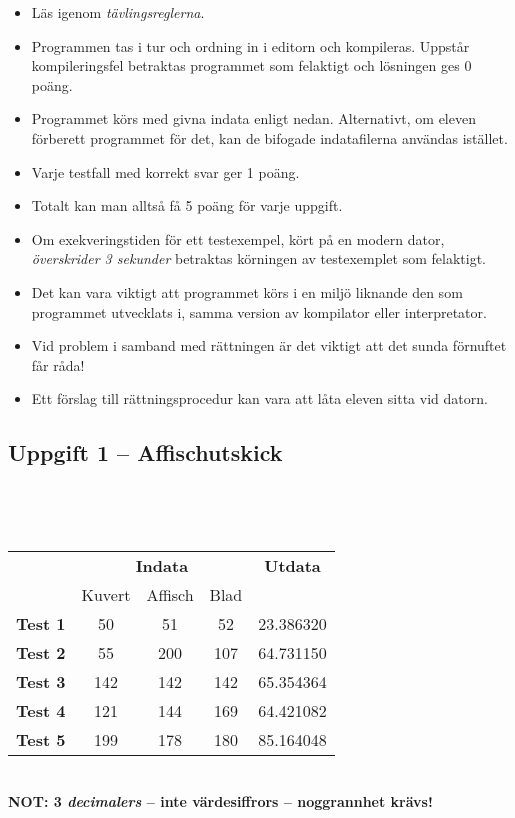 \documentclass[a4paper,12pt,oneside]{amsbook}
\theoremstyle{test}
\newcommand{\fe}[1]{\textbf{#1}}            %
\begin{document}


\thispagestyle{fancy}
\lhead{}
\begin{itemize}
\item Läs igenom \textit{tävlingsreglerna}.
\item Programmen tas i tur och ordning in i editorn och kompileras.
Uppstår kompileringsfel betraktas programmet som felaktigt och lösningen
ges $0$ poäng.
\item Programmet körs med givna indata enligt nedan. Alternativt, om eleven förberett programmet för det, kan de bifogade indatafilerna användas istället.
\item Varje testfall
  med korrekt svar ger 1 poäng.
\item
Totalt kan man
  alltså få 5 poäng för varje uppgift.
\item Om exekveringstiden för ett testexempel, kört på en modern dator,
\textit{överskrider 3 sekunder} betraktas körningen av testexemplet som felaktigt.
\item Det kan vara viktigt att programmet körs i en miljö liknande den som
programmet utvecklats i, samma version av kompilator eller
interpretator.
\item Vid problem i samband med rättningen är det viktigt att det sunda
förnuftet får råda!
\item Ett förslag till rättningsprocedur kan vara att låta eleven
sitta vid datorn.
\end{itemize}

\vspace{2cm}

\subsection*{Uppgift 1 -- Affischutskick}
~\\
{\tt 
\begin{tabular}{||l||c|c|c||c||}\hline\hline
& \multicolumn{3}{c||}{\fe{Indata}} & \fe{Utdata} \\ 
& Kuvert & Affisch & Blad & \\ \hline \hline
\fe{Test 1} & 50 & 51 & 52 & 23.386320  \\ \hline
\fe{Test 2} & 55 & 200 & 107 &  64.731150  \\ \hline
\fe{Test 3} & 142 & 142 & 142 &  65.354364 \\ \hline
\fe{Test 4} & 121 & 144 & 169 & 64.421082\\ \hline
\fe{Test 5} & 199 & 178 & 180 & 85.164048  \\ \hline\hline
\end{tabular}
}
\\[0.3em]
\textbf{NOT: 3 \emph{decimalers} -- inte värdesiffrors -- noggrannhet krävs!}
\end{document}

